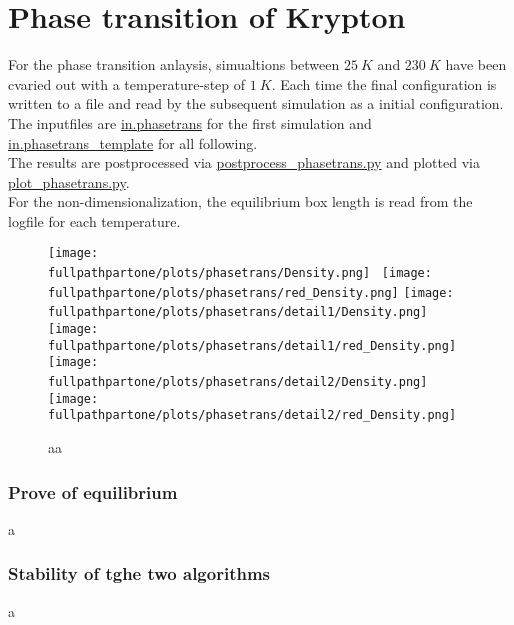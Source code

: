 \documentclass[10pt,a4paper]{report}
\def \pathpartone {../../1_three-dimensional_atomic_system}
\def \fullpathpartone {/home/lukas/Desktop/project/independence/atomistic_modeling/exam/1_three-dimensional_atomic_system}
\begin{document}
\section{Phase transition of Krypton}


For the phase transition anlaysis, simualtions between $25~K$ and $230~K$ have been cvaried out with a temperature-step of $1~K$. Each time the final configuration is written to a file and read by the subsequent simulation as a initial configuration.\\
The inputfiles are \href{\pathpartone/in.phasetrans}{in.phasetrans} for the first simulation and \href{\pathpartone/in.phasetrans_template}{in.phasetrans\_template} for all following.\\
The results are postprocessed via \href{\pathpartone/postprocess_phasetrans.py}{postprocess\_phasetrans.py} and plotted via \href{\pathpartone/plot_phasetrans.py}{plot\_phasetrans.py}.\\
For the non-dimensionalization, the equilibrium box length is read from the logfile for each temperature.



\begin{center}
\begin{figure}[h]
\texttt{[image: \\fullpathpartone/plots/phasetrans/Density.png]}~
\texttt{[image: \\fullpathpartone/plots/phasetrans/red\_Density.png]}
\texttt{[image: \\fullpathpartone/plots/phasetrans/detail1/Density.png]}~
\texttt{[image: \\fullpathpartone/plots/phasetrans/detail1/red\_Density.png]}
\texttt{[image: \\fullpathpartone/plots/phasetrans/detail2/Density.png]}~
\texttt{[image: \\fullpathpartone/plots/phasetrans/detail2/red\_Density.png]}
\caption[aaa]{aa}
\label{fig:aa}
\end{figure}
\end{center}














\subsubsection{Prove of equilibrium}
a
\subsubsection{Stability of tghe two algorithms}
a
\end{document}

